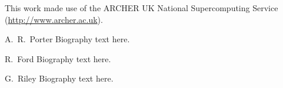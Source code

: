 \documentclass[journal]{IEEEtran}
\begin{document}
This work made use of the ARCHER UK National Supercomputing Service
(\url{http://www.archer.ac.uk}).



%

% 

\begin{IEEEbiographynophoto}{A.~R.~Porter}
Biography text here.
\end{IEEEbiographynophoto}

\begin{IEEEbiographynophoto}{R.~Ford}
Biography text here.
\end{IEEEbiographynophoto}


\begin{IEEEbiographynophoto}{G.~Riley}
Biography text here.
\end{IEEEbiographynophoto}





\end{document}
